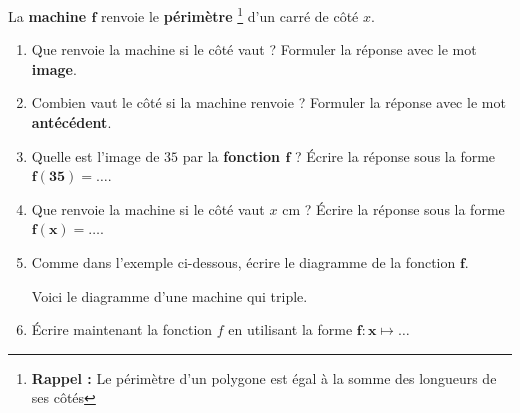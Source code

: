 \begin{exercice}
    La \textbf{machine $\boldsymbol{f}$} renvoie le \textbf{périmètre} \footnote{\textbf{Rappel :} Le périmètre d'un polygone est égal à la somme des longueurs de ses côtés} d'un carré de côté $x$.
    \begin{center}
    \end{center}
    \vspace*{-5mm} 
  \begin{enumerate}
    \item Que renvoie la machine si le côté vaut   ? Formuler la réponse avec le mot \textbf{image}.
    \item Combien vaut le côté si la machine renvoie   ? Formuler la réponse avec le mot \textbf{antécédent}.
    \item Quelle est l'image de $35$ par la \textbf{fonction $\boldsymbol{f}$ } ? Écrire la réponse sous la forme $\boldsymbol{f(35)=\ldots}$.
    \item Que renvoie la machine si le côté vaut $x$ cm ? Écrire la réponse sous la forme $\boldsymbol{f(x)=\ldots}$.
    \item Comme dans l'exemple ci-dessous, écrire le diagramme de la fonction $\boldsymbol{f}$.
        \begin{exemple*1}
            Voici le diagramme d'une machine qui triple.
            
            \medskip
        \end{exemple*1}

        \medskip
    \item Écrire maintenant la fonction $f$ en utilisant la forme $\boldsymbol{f:x} \longmapsto \ldots$
\end{enumerate}

\end{exercice}
